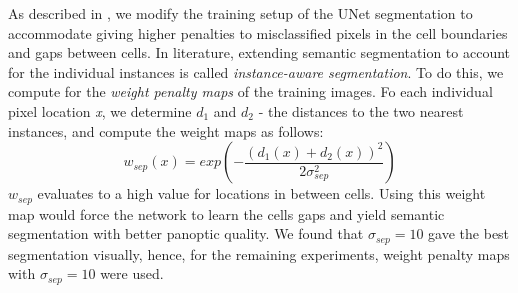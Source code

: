 \documentclass[journal]{IEEEtran}
\begin{document}
As described in \cite{nature_unet}, we modify the training setup of the UNet segmentation to accommodate giving higher penalties to misclassified pixels in the cell boundaries and gaps between cells. In literature, extending semantic segmentation to account for the individual instances is called \textit{instance-aware segmentation}. To do this, we compute for the \textit{weight penalty maps} of the training images.
Fo each individual pixel location \textit{x}, we determine \textit{$d_1$} and \textit{$d_2$} - the distances to the two nearest instances, and compute the weight maps as follows:
\begin{equation}
w_{sep}(x) = exp\left({-\frac{(d_1(x) + d_2(x))^2}{2\sigma^2_{sep}}}\right)
\end{equation}
$w_{sep}$ evaluates to a high value for locations in between  cells. Using this weight map would force the network to learn the cells gaps and yield semantic segmentation with better panoptic quality. We found that $\sigma_{sep} = 10$ gave the best segmentation visually, hence, for the remaining experiments, weight penalty maps with $\sigma_{sep} = 10$ were used. 
\end{document}
